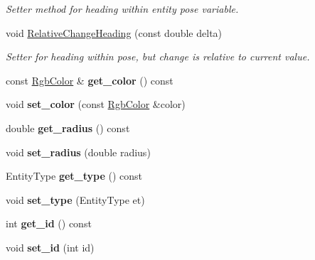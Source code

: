 \begin{DoxyCompactItemize}
\begin{DoxyCompactList}\small\item\em Setter method for heading within entity pose variable. \end{DoxyCompactList}\item 
void \hyperlink{classArenaEntity_a4c4bd7f5ffb778979303c33cb3bc9986}{Relative\+Change\+Heading} (const double delta)
\begin{DoxyCompactList}\small\item\em Setter for heading within pose, but change is relative to current value. \end{DoxyCompactList}\item 
const \hyperlink{structRgbColor}{Rgb\+Color} \& {\bfseries get\+\_\+color} () const \hypertarget{classArenaEntity_a9ba62519f6c6294373fdc8488713b4e0}{}\label{classArenaEntity_a9ba62519f6c6294373fdc8488713b4e0}

\item 
void {\bfseries set\+\_\+color} (const \hyperlink{structRgbColor}{Rgb\+Color} \&color)\hypertarget{classArenaEntity_a1ac33beda7462ac5c7f4f71a70d3fb10}{}\label{classArenaEntity_a1ac33beda7462ac5c7f4f71a70d3fb10}

\item 
double {\bfseries get\+\_\+radius} () const \hypertarget{classArenaEntity_a5a2b834ad654f42785c3073c25a0fea8}{}\label{classArenaEntity_a5a2b834ad654f42785c3073c25a0fea8}

\item 
void {\bfseries set\+\_\+radius} (double radius)\hypertarget{classArenaEntity_a2b0c2512fe53d143442da5e357f71505}{}\label{classArenaEntity_a2b0c2512fe53d143442da5e357f71505}

\item 
Entity\+Type {\bfseries get\+\_\+type} () const \hypertarget{classArenaEntity_a69a818480868f9b0417e6f9ed20dfc96}{}\label{classArenaEntity_a69a818480868f9b0417e6f9ed20dfc96}

\item 
void {\bfseries set\+\_\+type} (Entity\+Type et)\hypertarget{classArenaEntity_aa65c584906d4c22f61488fab98c3392c}{}\label{classArenaEntity_aa65c584906d4c22f61488fab98c3392c}

\item 
int {\bfseries get\+\_\+id} () const \hypertarget{classArenaEntity_aee353e402d9b8a7372fae30b7a0ce4a0}{}\label{classArenaEntity_aee353e402d9b8a7372fae30b7a0ce4a0}

\item 
void {\bfseries set\+\_\+id} (int id)\hypertarget{classArenaEntity_a67f4c0467d32eec76ee6ed033ff9ed2f}{}\label{classArenaEntity_a67f4c0467d32eec76ee6ed033ff9ed2f}


\end{DoxyCompactItemize}
